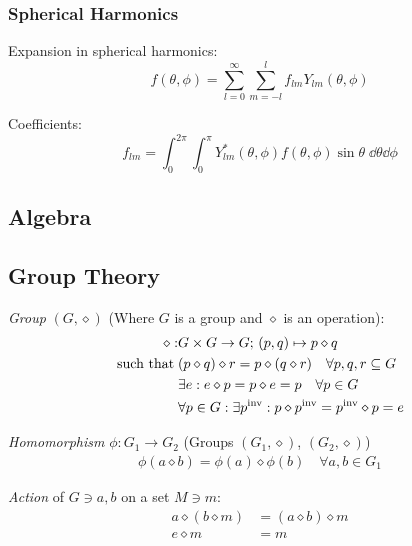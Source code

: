 		\subsubsection{Spherical Harmonics}
			\noindent
			Expansion in spherical harmonics:
			\begin{equation}
				f(\theta, \phi) = \sum_{l=0}^{\infty} \sum_{m=-l}^{l} f_{lm} Y_{lm}(\theta,\phi)
			\end{equation}

			\noindent
			Coefficients:
			\begin{equation}
				f_{lm} = \int_0^{2\pi} \int_0^\pi Y_{lm}^{*}(\theta,\phi) f(\theta,\phi) \sin\theta\;\dd\theta\dd\phi
			\end{equation}

	\subsection{Algebra}			
		\subsection{Group Theory}
			\emph{Group} $(G, \diamond)$ (Where $G$ is a group and $\diamond$ is an operation):
			\begin{equation}
				\begin{aligned}
					\diamond: &G \times G \rightarrow G;\, (p,q) \mapsto p\diamond q \\
					\text{such that}\; &(p\diamond q)\diamond r = p\diamond (q\diamond r)\quad\forall{p,q,r}\subseteq G \\
					&\exists e: e\diamond p = p\diamond e = p\quad\forall p\in G\\
					&\forall p \in G: \exists {p}^\mathrm{inv}: p\diamond {p}^\mathrm{inv}= {p}^\mathrm{inv}\diamond p=e
				\end{aligned}
			\end{equation}
			
			\noindent
			\emph{Homomorphism} $\phi: G_1 \rightarrow G_2$ (Groups $(G_1,\diamond)$, $(G_2,\diamond)$)
			\begin{equation}
				\begin{aligned}
					\phi(a \diamond b) = \phi(a) \diamond \phi(b) \quad \forall a,b \in G_1
				\end{aligned}
			\end{equation}
			
			\noindent
			\emph{Action} of $G\ni a, b$ on a set $M\ni m$:
			\begin{equation}
				\begin{aligned}
					a\diamond (b\diamond m) &= (a \diamond b) \diamond m \\
					e \diamond m &= m \\
				\end{aligned}
			\end{equation}
			
